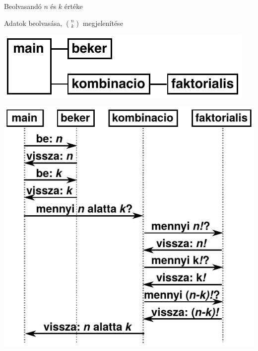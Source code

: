 \documentclass[usenames,dvipsnames,aspectratio=169]{beamer}
\begin{document}
\begin{frame}
  \begin{description}[mm]
    \item[Beolvasás] Beolvasandó $n$ és $k$ értéke
    \item[Főprogram] Adatok beolvasása, ${n \choose k}$ megjelenítése
  \end{description}
  \vfill
  \begin{center}
    \includegraphics{nk1.pdf}
  \end{center}
\end{frame}

\begin{frame}
  \begin{center}
    \includegraphics[scale=0.75]{nk2.pdf}
  \end{center}
\end{frame}

\begin{frame}
  \begin{exampleblock}{}
    \vspace{-.2cm}
    
    \vspace{-.2cm}
  \end{exampleblock}
\end{frame}
\end{document}
